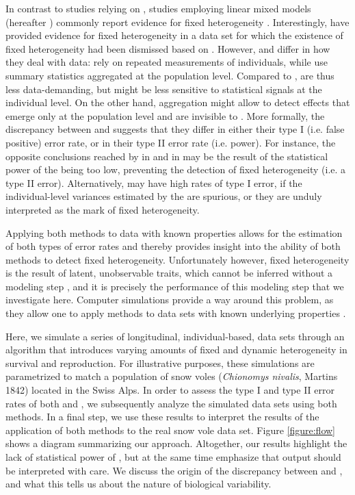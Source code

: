 In contrast to studies relying on \NSM, studies employing linear mixed models (hereafter \MM) commonly report evidence for fixed heterogeneity \parencite[e.g.][] {Cam2000,Royle2008,Chambert2013,Guillemain2013,Chambert2014}. Interestingly, \cite{Cam2013} have provided evidence for fixed heterogeneity in a data set for which the existence of fixed heterogeneity had been dismissed based on \NSM \parencite{Steiner2010}. However, \MM and \NSM differ in how they deal with data: \MM rely on repeated measurements of individuals, while \NSM use summary statistics aggregated at the population level. Compared to \MM, \NSM are thus less data-demanding, but might be less sensitive to statistical signals at the individual level. On the other hand, aggregation might allow \NSM to detect effects that emerge only at the population level and are invisible to \MM.
More formally, the discrepancy between \NSM and \MM suggests that they differ in either their type I (i.e. false positive) error rate, or in their type II error rate (i.e. power). For instance, the opposite conclusions reached by \NSM in \cite{Steiner2010} and \MM in \cite{Cam2013} may be the result of the statistical power of the \NSM being too low, preventing the detection of fixed heterogeneity (i.e. a type II error). Alternatively, \MM may have high rates of type I error, if the individual-level variances estimated by the \MM are spurious, or they are unduly interpreted as the mark of fixed heterogeneity.

Applying both methods to data with known properties allows for the estimation of both types of error rates and thereby provides insight into the ability of both methods to detect fixed heterogeneity. Unfortunately however, fixed heterogeneity is the result of latent, unobservable traits, which cannot be inferred without a modeling step \parencite{Cam2013}, and it is precisely the performance of this modeling step that we investigate here. Computer simulations provide a way around this problem, as they allow one to apply methods to data sets with known underlying properties \parencite[e.g.][]{DeVillemereuil2013,Brooks2013}.

Here, we simulate a series of longitudinal, individual-based, data sets through an algorithm that introduces varying amounts of fixed and dynamic heterogeneity in survival and reproduction. For illustrative purposes, these simulations are parametrized to match a population of snow voles (\textit{Chionomys nivalis}, Martins 1842) located in the Swiss Alps. In order to assess the type I and type II error rates of both \NSM and \MM, we subsequently analyze the simulated data sets using both methods. In a final step, we use these results to interpret the results of the application of both methods to the real snow vole data set. Figure \ref{figure:flow} shows a diagram summarizing our approach. Altogether, our results highlight the lack of statistical power of \NSM, but at the same time emphasize that \MM output should be interpreted with care. We discuss the origin of the discrepancy between \NSM and \MM, and what this tells us about the nature of biological variability.

